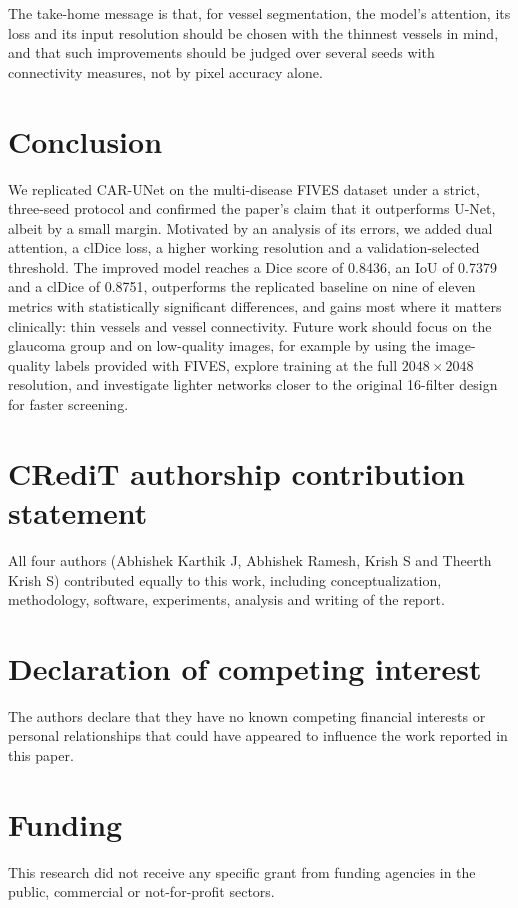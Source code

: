 \documentclass[a4paper,fleqn]{cas-sc}
\begin{document}
The take-home message is that, for vessel segmentation, the model's attention, its loss and its input resolution should be chosen with the thinnest vessels in mind, and that such improvements should be judged over several seeds with connectivity measures, not by pixel accuracy alone.

\section{Conclusion}
\label{sec:conclusion}

We replicated CAR-UNet on the multi-disease FIVES dataset under a strict, three-seed protocol and confirmed the paper's claim that it outperforms U-Net, albeit by a small margin. Motivated by an analysis of its errors, we added dual attention, a clDice loss, a higher working resolution and a validation-selected threshold. The improved model reaches a Dice score of 0.8436, an IoU of 0.7379 and a clDice of 0.8751, outperforms the replicated baseline on nine of eleven metrics with statistically significant differences, and gains most where it matters clinically: thin vessels and vessel connectivity. Future work should focus on the glaucoma group and on low-quality images, for example by using the image-quality labels provided with FIVES, explore training at the full $2048\times2048$ resolution, and investigate lighter networks closer to the original 16-filter design for faster screening.

\section*{CRediT authorship contribution statement}
All four authors (Abhishek Karthik J, Abhishek Ramesh, Krish S and Theerth Krish S) contributed equally to this work, including conceptualization, methodology, software, experiments, analysis and writing of the report.

\section*{Declaration of competing interest}
The authors declare that they have no known competing financial interests or personal relationships that could have appeared to influence the work reported in this paper.

\section*{Funding}
This research did not receive any specific grant from funding agencies in the public, commercial or not-for-profit sectors.
\end{document}
